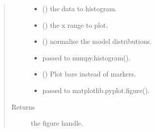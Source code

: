 \documentclass[letterpaper,10pt,english]{sphinxmanual}
\begin{document}
\begin{fulllineitems}
\begin{quote}
\begin{description}
\begin{itemize}
\item {} 
\sphinxAtStartPar
{} () \textendash{} the data to histogram.

\item {} 
\sphinxAtStartPar
{} () \textendash{} the x range to plot.

\item {} 
\sphinxAtStartPar
{} () \textendash{} normalise the model distributions.

\item {} 
\sphinxAtStartPar
{} \textendash{} passed to numpy.histogram().

\item {} 
\sphinxAtStartPar
{} () \textendash{} Plot bars instead of markers.

\item {} 
\sphinxAtStartPar
{} \textendash{} passed to matplotlib.pyplot.figure().

\end{itemize}

\item[{Returns}] \leavevmode
\sphinxAtStartPar
the figure handle.

\end{description}\end{quote}

\end{fulllineitems}


\begin{fulllineitems}
\label{\detokenize{tes:tes.analysis.plot_state_fit}}
\end{fulllineitems}
\end{document}
